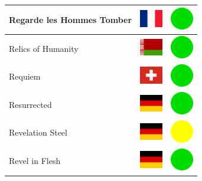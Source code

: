 \documentclass[12pt, a4paper, twoside]{report}
\begin{document}
\begin{center}
\begin{longtable}{|p{5cm}|p{2cm}|p{2cm}|}
 Regarde les Hommes Tomber                                  & \includegraphics[width=1cm]{../img/flags/fr} &   \includegraphics[width=1cm]{../likes/y} \\ \hline
 Relics of Humanity                                         & \includegraphics[width=1cm]{../img/flags/by} &   \includegraphics[width=1cm]{../likes/y} \\ \hline
 Requiem                                                    & \includegraphics[width=1cm]{../img/flags/ch} &   \includegraphics[width=1cm]{../likes/y} \\ \hline
 Resurrected                                                & \includegraphics[width=1cm]{../img/flags/de} &   \includegraphics[width=1cm]{../likes/y} \\ \hline
 Revelation Steel                                           & \includegraphics[width=1cm]{../img/flags/de} &   \includegraphics[width=1cm]{../likes/m} \\ \hline
 Revel in Flesh                                             & \includegraphics[width=1cm]{../img/flags/de} &   \includegraphics[width=1cm]{../likes/y} \\ \hline

\end{longtable}
\end{center}
\end{document}
